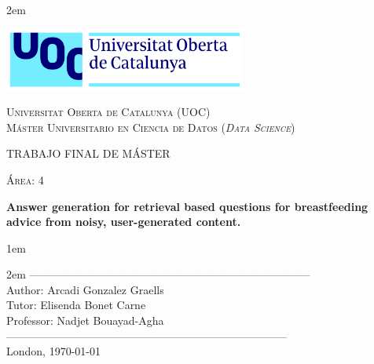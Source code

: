 \newpage
\thispagestyle{empty}

\baselineskip 2em


\centerline{\includegraphics[width=0.6\textwidth]{images/UOC-logo}}
\begin{center}
\textsc{Universitat Oberta de Catalunya (UOC) \\
 Máster Universitario en Ciencia de Datos (\textit{Data Science})\\}


\vspace*{1.5cm}

\textsc{\Large TRABAJO FINAL DE MÁSTER}

\vspace*{0.5cm}

\textsc{\large Área: 4}



\vspace*{2.0cm}

\textbf{\Large Answer generation for retrieval based questions for breastfeeding advice from noisy, 
user-generated content.}


\vspace{2.5cm}
\baselineskip 1em

\baselineskip 2em
-----------------------------------------------------------------------------\\
Author:     Arcadi Gonzalez Graells\\
Tutor:      Elisenda Bonet Carne\\
Professor:   Nadjet Bouayad-Agha \\
-----------------------------------------------------------------------------\\
\vspace*{1.5cm}
London, \today

\end{center}

\newpage
\pagestyle{empty}
\hfill
